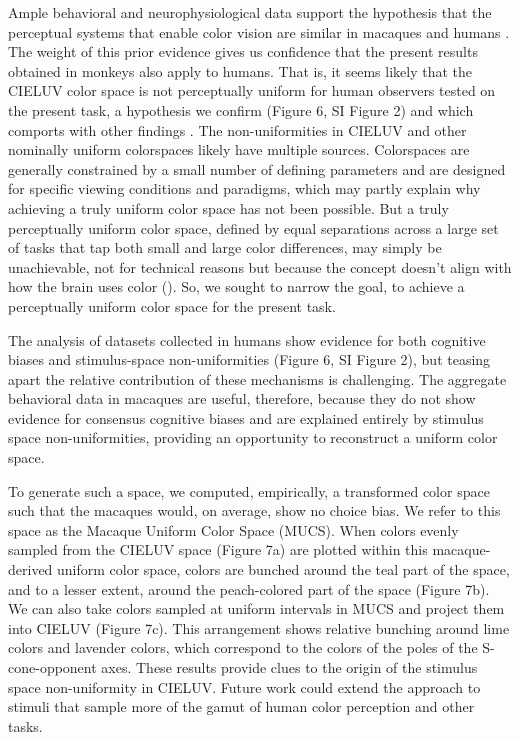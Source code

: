 \documentclass[9pt,biorxiv,lineno,onehalfspacing]{lapreprint}
\begin{document}
\begin{refsection}
Ample behavioral and neurophysiological data support the hypothesis that the perceptual systems that enable color vision are similar in macaques and humans \citep{schnapf_spectral_1987,gagin_color-detection_2014,horwitz_what_2015,lafer-sousa_color-biased_2016}. 
The weight of this prior evidence gives us confidence that the present results obtained in monkeys also apply to humans. 
That is, it seems likely that the CIELUV color space is not perceptually uniform for human observers tested on the present task, a hypothesis we confirm (Figure 6, SI Figure 2) and which comports with other findings \citep{stockman_colorimetry_2010,judd_ideal_1970,bujack_non-riemannian_2022}. 
The non-uniformities in CIELUV and other nominally uniform colorspaces likely have multiple sources. Colorspaces are generally constrained by a small number of defining parameters and are designed for specific viewing conditions and paradigms, which may partly explain why achieving a truly uniform color space has not been possible. 
But a truly perceptually uniform color space, defined by equal separations across a large set of tasks that tap both small and large color differences, may simply be unachievable, not for technical reasons but because the concept doesn't align with how the brain uses color (\citep{rosenthal_color_2021}). 
So, we sought to narrow the goal, to achieve a perceptually uniform color space for the present task. 

The analysis of datasets collected in humans show evidence for both cognitive biases and stimulus-space non-uniformities (Figure 6, SI Figure 2), but teasing apart the relative contribution of these mechanisms is challenging. 
The aggregate behavioral data in macaques are useful, therefore, because they do not show evidence for consensus cognitive biases and are explained entirely by stimulus space non-uniformities, providing an opportunity to reconstruct a uniform color space.

To generate such a space, we computed, empirically, a transformed color space such that the macaques would, on average, show no choice bias. 
We refer to this space as the Macaque Uniform Color Space (MUCS). 
When colors evenly sampled from the CIELUV space (Figure 7a) are plotted within this macaque-derived uniform color space, colors are bunched around the teal part of the space, and to a lesser extent, around the peach-colored part of the space (Figure 7b). We can also take colors sampled at uniform intervals in MUCS and project them into CIELUV (Figure 7c). 
This arrangement shows relative bunching around lime colors and lavender colors, which correspond to the colors of the poles of the S-cone-opponent axes. 
These results provide clues to the origin of the stimulus space non-uniformity in CIELUV. Future work could extend the approach to stimuli that sample more of the gamut of human color perception and other tasks. 


\end{refsection}
\end{document}
